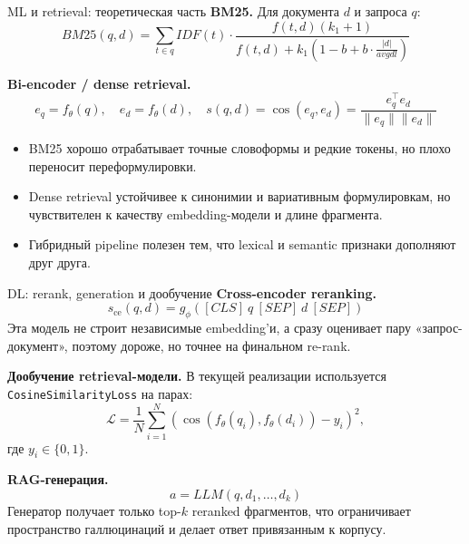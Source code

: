 \documentclass[aspectratio=169,11pt]{beamer}
\begin{document}
\begin{frame}{ML и retrieval: теоретическая часть}
  \small
  \textbf{BM25.} Для документа $d$ и запроса $q$:
  \[
    BM25(q,d) = \sum_{t \in q} IDF(t) \cdot
    \frac{f(t,d)(k_1 + 1)}{f(t,d) + k_1 \left(1 - b + b \cdot \frac{|d|}{avgdl}\right)}
  \]

  \textbf{Bi-encoder / dense retrieval.}
  \[
    e_q = f_\theta(q), \quad e_d = f_\theta(d), \quad
    s(q,d) = \cos(e_q, e_d) = \frac{e_q^\top e_d}{\|e_q\|\|e_d\|}
  \]

  \footnotesize
  \begin{itemize}
    \item BM25 хорошо отрабатывает точные словоформы и редкие токены, но плохо переносит переформулировки.
    \item Dense retrieval устойчивее к синонимии и вариативным формулировкам, но чувствителен к качеству embedding-модели и длине фрагмента.
    \item Гибридный pipeline полезен тем, что lexical и semantic признаки дополняют друг друга.
  \end{itemize}
\end{frame}

\begin{frame}{DL: rerank, generation и дообучение}
  \small
  \textbf{Cross-encoder reranking.}
  \[
    s_{\text{ce}}(q,d) = g_\phi([CLS]\ q\ [SEP]\ d\ [SEP])
  \]
  Эта модель не строит независимые embedding'и, а сразу оценивает пару «запрос-документ», поэтому дороже, но точнее на финальном re-rank.

  \vspace{0.3em}
  \textbf{Дообучение retrieval-модели.} В текущей реализации используется \texttt{CosineSimilarityLoss} на парах:
  \[
    \mathcal{L} = \frac{1}{N} \sum_{i=1}^{N} \left(\cos(f_\theta(q_i), f_\theta(d_i)) - y_i\right)^2,
  \]
  где $y_i \in \{0,1\}$.

  \vspace{0.3em}
  \textbf{RAG-генерация.}
  \[
    a = LLM(q, d_1, \dots, d_k)
  \]
  Генератор получает только top-$k$ reranked фрагментов, что ограничивает пространство галлюцинаций и делает ответ привязанным к корпусу.
\end{frame}
\end{document}
